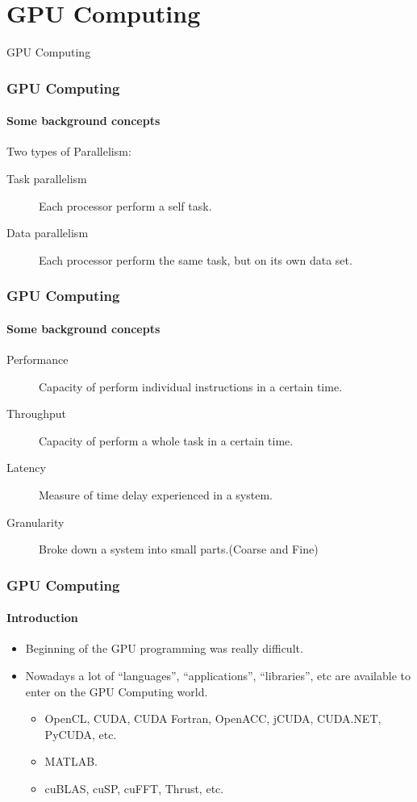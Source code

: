 \section{GPU Computing}
\begin{frame}
    \begin{center}
        {\Huge GPU Computing}
    \end{center}
\end{frame}

\begin{frame}
    \frametitle{GPU Computing}
    \framesubtitle{Some background concepts}
    Two types of Parallelism:
    \begin{description}
        \item[Task parallelism]
            Each processor perform a self task.
        \item[Data parallelism]
            Each processor perform the same task, but on its own data set.
    \end{description}
\end{frame}

\begin{frame}
    \frametitle{GPU Computing}
    \framesubtitle{Some background concepts}
    \begin{description}
        \item[Performance]
                Capacity of perform individual instructions in a certain time.
        \item[Throughput]
                Capacity of perform a whole task in a certain time.
        \item[Latency]
                Measure of time delay experienced in a system.
        \item[Granularity]
                Broke down a system into small parts.(Coarse and Fine)
    \end{description}
\end{frame}

\begin{frame}
    \frametitle{GPU Computing}
    \framesubtitle{Introduction}
    \begin{itemize}
        \item Beginning of the GPU programming was really difficult.
        \item Nowadays a lot of ``languages'', ``applications'', ``libraries'', etc
            are available to enter on the GPU Computing world.
        \begin{itemize}
            \item OpenCL, CUDA, CUDA Fortran, OpenACC, jCUDA, CUDA.NET, PyCUDA, etc.
            \item MATLAB.
            \item cuBLAS, cuSP, cuFFT, Thrust, etc.
        \end{itemize}
    \end{itemize}
\end{frame}

